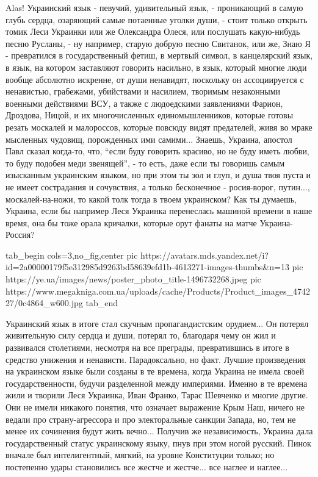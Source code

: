 Alas! Украинский язык - певучий, удивительный язык, - проникающий в самую глубь
сердца, озаряющий самые потаенные уголки души, - стоит только открыть томик
Леси Украинки или же Олександра Олеся, или послушать какую-нибудь песню
Русланы, - ну например, старую добрую песню Свитанок, или же, Знаю Я -
превратился в государственный фетиш, в мертвый символ, в канцелярский язык, в
язык, на котором заставляют говорить насильно, в язык, который многие люди
вообще абсолютно искренне, от души ненавидят, поскольку он ассоциируется с
ненавистью, грабежами, убийствами и насилием, творимым незаконными военными
действиями ВСУ, а также с людоедскими заявлениями Фарион, Дроздова, Ницой, и их
многочисленных единомышленников, которые готовы резать москалей и малороссов,
которые повсюду видят предателей, живя во мраке мысленных чудовищ, порожденных
ими самими... Знаешь, Украина, апостол Павл сказал когда-то, что, \enquote{если
буду говорить красиво, но не буду иметь любви, то буду подобен меди звенящей},
- то есть, даже если ты говоришь самым изысканным украинским языком, но при
этом ты зол и глуп, и душа твоя пуста и не имеет сострадания и сочувствия, а
только бесконечное - росия-ворог, путин..., москалей-на-ножи, то какой толк
тогда в твоем украинском? Как ты думаешь, Украина, если бы например Леся Украинка перенеслась
машиной времени в наше время, она бы тоже орала кричалки, которые орут фанаты
на матче Украина-Россия?

\ifcmt
  tab_begin cols=3,no_fig,center
     pic https://avatars.mds.yandex.net/i?id=2a00000179f5e312985d9263bd58639efd1b-4613271-images-thumbs&n=13
     pic https://ye.ua/images/news/poster_photo_title-1496732268.jpeg
     pic https://www.megakniga.com.ua/uploads/cache/Products/Product_images_474227/0c4864_w600.jpg
  tab_end
\fi

Украинский язык в итоге стал скучным пропагандистским орудием... Он потерял
живительную силу сердца и души, потерял то, благодаря чему он жил и развивался
столетиями, несмотря на все преграды, превратившись в итоге в средство унижения
и ненависти. Парадоксально, но факт. Лучшие произведения на украинском языке
были созданы в те времена, когда Украина не имела своей государственности,
будучи разделенной между империями. Именно в те времена жили и творили Леся
Украинка, Иван Франко, Тарас Шевченко и многие другие. Они не имели никакого
понятия, что означает выражение Крым Наш, ничего не ведали про страну-агрессора
и про электоральные санкции Запада, но, тем не менее их сочинения будут жить
вечно... Получив же независимость, Украина дала государственный статус
украинскому языку, пнув при этом ногой русский. Пинок вначале был
интелигентный, мягкий, на уровне Конституции только; но постепенно удары
становились все жестче и жестче... все наглее и наглее... 

